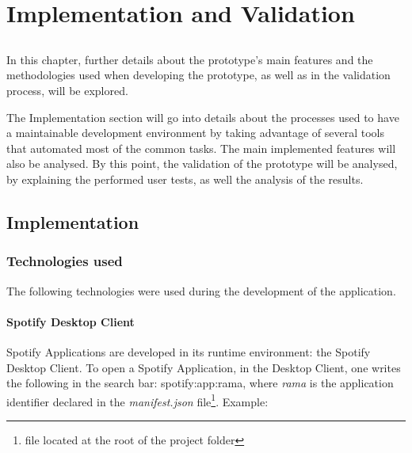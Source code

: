

\chapter{Implementation and Validation}
\label{chap:chap4}

\section*{}

In this chapter, further details about the prototype's main features and the methodologies used when developing the prototype, as well as in the validation process, will be explored.

The Implementation section will go into details about the processes used to have a maintainable development environment by taking advantage of several tools that automated most of the common tasks. The main implemented features will also be analysed.
By this point, the validation of the prototype will be analysed, by explaining the performed user tests, as well the analysis of the results.

\section{Implementation} %
\label{sec:implementation}
    
  \subsection{Technologies used} %
  \label{sub:technologies}

    The following technologies were used during the development of the application.


    \subsubsection{Spotify Desktop Client} %
    \label{ssub:subsection_name}
      Spotify Applications are developed in its runtime environment: the Spotify Desktop Client.
      To open a Spotify Application, in the Desktop Client, one writes the following in the search bar: spotify:app:rama, where \emph{rama} is the application identifier declared in the \emph{manifest.json} file\footnote{file located at the root of the project folder}.
      Example:

      

